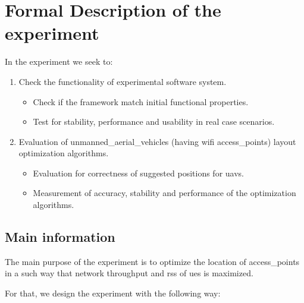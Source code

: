 \section{Formal Description of the
experiment}\label{formal-description-of-the-experiment}

In the experiment we seek to:

\begin{enumerate}
\def\labelenumi{\arabic{enumi}.}
\tightlist
\item
  Check the functionality of experimental software system.
  
  \begin{itemize}
  	\tightlist
  	\item
  	Check if the framework match initial functional properties.
  	\item
  	Test for stability, performance and usability in real case scenarios.
  \end{itemize}

\item
  Evaluation of \glspl{unmanned_aerial_vehicle} (having \gls{wifi} \glspl{access_point}) layout optimization algorithms.
  
  \begin{itemize}
  	\tightlist
  	\item
  	Evaluation for correctness of suggested positions for \glspl{uav}.
  	\item
  	Measurement of accuracy, stability and performance of the	optimization algorithms.
  \end{itemize}
  
\end{enumerate}


\subsection{Main information}\label{main-information}

The main purpose of the experiment is to optimize the location of \glspl{access_point} in a such way that network throughput and \gls{rss} of \glspl{ue} is maximized.

For that, we design the experiment with the following way:

